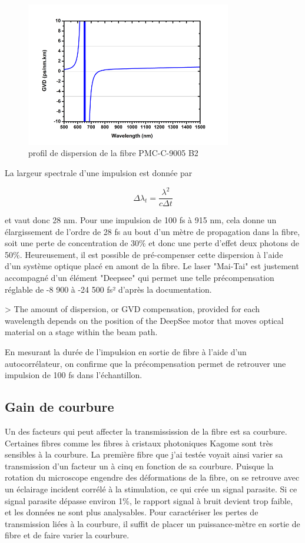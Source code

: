 \begin{figure}
\centering
\includegraphics[width=0.8\textwidth]{./files/fiber-dispersion.png}
\caption{profil de dispersion de la fibre PMC-C-9005 B2}
\end{figure}

La largeur spectrale d'une impulsion est donnée par

$$
\Delta \lambda_t = \frac{\lambda^2}{c\Delta t}
$$

et vaut donc 28 nm. Pour une impulsion de 100 fs à 915 nm, cela donne un élargissement de l'ordre de 28 fs au bout d'un mètre de propagation dans la fibre, soit une perte de concentration de 30\% et donc une perte d'effet deux photons de 50\%. Heureusement, il est possible de pré-compenser cette dispersion à l'aide d'un système optique placé en amont de la fibre. Le laser "Mai-Tai" est justement accompagné d'un élément "Deepsee" qui permet une telle précompensation réglable de -8 900 à -24 500 fs² d'après la documentation.

> The amount of dispersion, or GVD compensation, provided for each wavelength depends on the position of the DeepSee motor that moves optical material on a stage within the beam path.

En mesurant la durée de l'impulsion en sortie de fibre à l'aide d'un autocorrélateur, on confirme que la précompensation permet de retrouver une impulsion de 100 fs dans l'échantillon.

\subsection{Gain de courbure}

Un des facteurs qui peut affecter la transmissission de la fibre est sa courbure. Certaines fibres comme les fibres à cristaux photoniques Kagome sont très sensibles à la courbure. La première fibre que j'ai testée voyait ainsi varier sa transmission d'un facteur un à cinq en fonction de sa courbure. Puisque la rotation du microscope engendre des déformations de la fibre, on se retrouve avec un éclairage incident corrélé à la stimulation, ce qui crée un signal parasite. Si ce signal parasite dépasse environ 1\%, le rapport signal à bruit devient trop faible, et les données ne sont plus analysables. Pour caractériser les pertes de transmission liées à la courbure, il suffit de placer un puissance-mètre en sortie de fibre et de faire varier la courbure.

